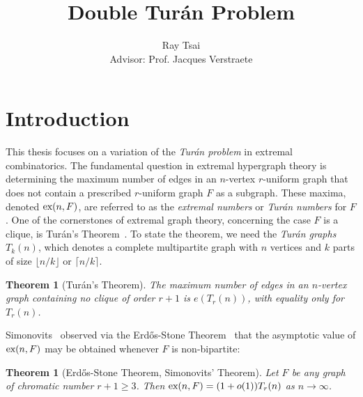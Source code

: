 \documentclass[12pt]{article}
\title{Double Turán Problem}
\author{Ray Tsai \\ Advisor: Prof. Jacques Verstraete}
\newcounter{foo}
\newtheorem{oldtheorem}[foo]{Theorem}
\newcommand*{\ex}{\textnormal{ex}}
\begin{document}
\maketitle



\vspace*{-1cm}

\tableofcontents

\newpage

\section{Introduction}

This thesis focuses on a variation of the \textit{Turán problem} in extremal combinatorics.  The fundamental question in extremal hypergraph theory is determining the maximum number of edges in an $n$-vertex $r$-uniform graph that does not contain a prescribed $r$-uniform graph $F$ as a subgraph. These maxima, denoted $\ex(n, F)$, are referred to as the \textit{extremal numbers} or \textit{Turán numbers} for $F$. One of the cornerstones of extremal graph theory, concerning the case $F$ is a clique, is Tur\'{a}n's Theorem~\cite{Turan1941}. To state the theorem, we need the \textit{Tur\'{a}n graphs} $T_k(n)$, which denotes a complete multipartite graph with $n$ vertices and $k$ parts of size $\lfloor n/k\rfloor$ or $\lceil n/k\rceil$. 

\begin{oldtheorem}[Tur\'{a}n's Theorem]\label{thm:turan}
The maximum number of edges in an $n$-vertex graph containing no clique of order $r + 1$ is $e(T_r(n))$, with equality only for $T_r(n)$.
\end{oldtheorem}

Simonovits~\cite{ErdosSimonovits1966} observed via the Erd\H{o}s-Stone Theorem~\cite{ErdosStone1946} that the asymptotic value of $\ex(n, F)$ may be obtained whenever $F$ is non-bipartite:

\begin{oldtheorem}[Erd\H{o}s-Stone Theorem, Simonovits' Theorem]\label{thm:ess}
Let $F$ be any graph of chromatic number $r + 1 \geq 3$. Then $\ex(n, F) = (1 + o(1))T_r(n)$ as $n \rightarrow \infty$.
\end{oldtheorem}
\end{document}
